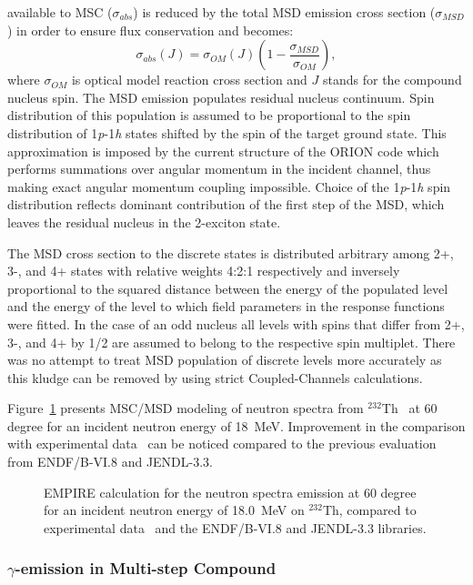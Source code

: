 \documentclass[twocolumn,amsmath,amssymb,10pt,groupedaddress,a4paper]{revtex4}
\begin{document}
available to MSC ($\sigma_{abs}$) is reduced by the total MSD emission
cross section ($\sigma_{MSD}$) in order to ensure flux conservation
and becomes:
\begin{equation}
\sigma_{abs}(J)=\sigma_{OM}(J)\left(1-\frac{\sigma_{MSD}}{\sigma_{OM}}\right),\label{CNabs}\end{equation}
\noindent where $\sigma_{OM}$ is optical model reaction cross section
and $J$ stands for the compound nucleus spin.
The MSD emission populates residual nucleus continuum.
Spin distribution of this population is assumed to be proportional
to the spin distribution of 1\emph{p}-1\emph{h} states shifted by
the spin of the target ground state. This approximation is imposed
by the current structure of the ORION code which performs
summations over angular momentum in the incident channel, thus making
exact angular momentum coupling impossible. Choice of the 1\emph{p}-1\emph{h}
spin distribution reflects dominant contribution of the first step
of the MSD, which leaves the residual nucleus in the 2-exciton
state.

The MSD cross section to the discrete states is distributed
arbitrary among 2+, 3-, and 4+ states with relative weights 4:2:1
respectively and inversely proportional to the squared distance between
the energy of the populated level and the energy of the level to which
field parameters in the response functions were fitted. In the case
of an odd nucleus all levels with spins that differ from 2+, 3-, and
4+ by 1/2 are assumed to belong to the respective spin multiplet.
There was no attempt to treat MSD population of discrete
levels more accurately as this kludge can be removed by using strict
Coupled-Channels calculations.

Figure~\ref{thoriumMSD} presents MSC/MSD modeling of neutron spectra from $^{232}$Th~\cite{crp} at
60 degree for an incident neutron energy of 18~MeV. Improvement in the comparison
with experimental data~\cite{mats} can be noticed compared to the previous evaluation from
ENDF/B-VI.8 and JENDL-3.3.
\begin{figure}[htbp]
\caption{EMPIRE calculation for the neutron spectra emission at 60 degree for an incident neutron
 energy of 18.0~MeV on $^{232}$Th, compared to experimental data~\cite{mats} and the ENDF/B-VI.8 and
JENDL-3.3 libraries.}
\label{thoriumMSD}
\end{figure}


\subsubsection{$\gamma$-emission in Multi-step Compound}
\end{document}
